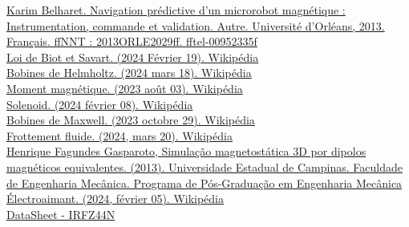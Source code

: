 \documentclass{article}
\begin{document}
\begin{thebibliography}{30} %

\href{https://theses.hal.science/tel-00952335/document}{Karim Belharet. Navigation prédictive d’un microrobot magnétique : Instrumentation, commande et
validation. Autre. Université d’Orléans, 2013. Français. ffNNT : 2013ORLE2029ff. fftel-00952335f
}\\ %

\href{https://en.wikipedia.org/wiki/Biot%E2%80%93Savart_law}{Loi de Biot et Savart. (2024 Février 19). Wikipédia}\\ 

\href{https://fr.wikipedia.org/wiki/Bobines_de_Helmholtz}{Bobines de Helmholtz. (2024 mars 18). Wikipédia}\\ 

\href{https://fr.wikipedia.org/wiki/Moment_magn%C3%A9tique}{Moment magnétique. (2023 août 03). Wikipédia}\\ 

\href{https://en.wikipedia.org/wiki/Solenoid}{Solenoid. (2024 février 08). Wikipédia}\\ 

\href{https://fr.wikipedia.org/wiki/Bobines_de_Maxwell}{Bobines de Maxwell. (2023 octobre 29). Wikipédia}\\ 

\href{https://fr.wikipedia.org/wiki/Frottement_fluide}{Frottement fluide. (2024, mars 20). Wikipédia}\\ 

\href{https://repositorio.unicamp.br/acervo/detalhe/911981?guid=1712060927140&returnUrl=\%2fresultado\%2flistar\%3fguid\%3d1712060927140\%26quantidadePaginas\%3d1\%26codigoRegistro\%3d911981\%23911981&i=1}{Henrique Fagundes Gasparoto, Simulação magnetostática 3D por dipolos magnéticos equivalentes. (2013). Universidade Estadual de Campinas. Faculdade de Engenharia Mecânica. Programa de Pós-Graduação em Engenharia Mecânica}\\

\href{https://fr.wikipedia.org/wiki/%C3%89lectroaimant}{Électroaimant. (2024, février 05). Wikipédia}\\ 

\href{https://www.infineon.com/dgdl/Infineon-IRFZ44N-DataSheet-v01_01-EN.pdf?fileId=5546d462533600a40153563b3a9f220d}{DataSheet - IRFZ44N}\\ 


\end{thebibliography}
\end{document}
